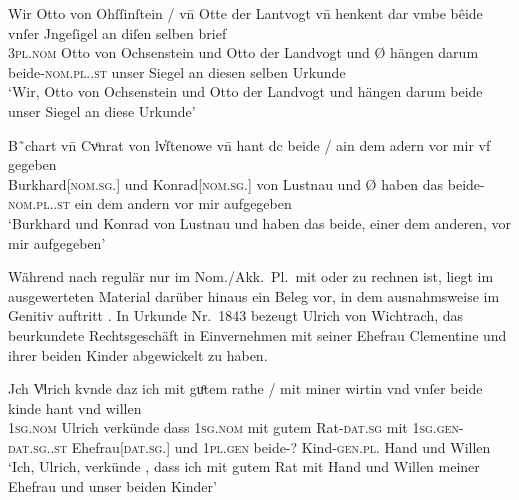 \begin{exe}
\ex \label{ex:vvfinctrl2}
	\begin{xlist}
	\ex \label{ex:vvfinctrl2_1}
		\gll Wir Otto von Ohſſinſtein / vn̄ Otte der Lantvogt \textelp{} vn̄ {}
				henkent {dar vmbe} bêide vnſer Jngeſigel an diſen selben
				brief \\
			\textsc{3pl\subM.nom} Otto von Ochsenstein {} und Otto der Landvogt
				{} und Ø\subM{} hängen darum beide-\textsc{nom.pl.\MascM.st}
				unser Siegel an diesen selben Urkunde \\
		\trans `Wir, Otto von Ochsenstein und Otto der Landvogt \textelp{}
			und  hängen darum beide unser Siegel an diese Urkunde'
			\parencites(Nr.~1145, Burg Ochsenstein, Dépt.~Bas-Rhin, 1289)[427,5--6]{cao2}

	\ex \label{ex:vvfinctrl2_2}
		\gll B˜chart vn̄ Cvͦnrat von lv̓ſtenowe \textelp{} vn̄ {} hant dc beide
				/ ain dem adern vor mir {vf gegeben} \\
			Burkhard[\textsc{nom.sg.\MascM}] und Konrad[\textsc{nom.sg.\MascM}]
				von Lustnau {} und Ø\subM{} haben das
				beide-\textsc{nom.pl.\MascM.st} {} ein dem andern vor mir
				aufgegeben \\
		\trans `Burkhard und Konrad von Lustnau \textelp{} und
			 haben das beide, einer dem anderen, vor mir
			aufgegeben'
			\parencites(Nr.~2607, Tübingen, 1297)[32,41--33,1]{cao4}
	\end{xlist}
\end{exe}

\label{phsec:beidegen}
Während nach \citet[623]{ksw2} regulär nur im Nom./Akk.~Pl.\ mit 
oder  zu rechnen ist, liegt im ausgewerteten Material darüber
hinaus ein Beleg vor, in dem  ausnahmsweise im Genitiv auftritt
. In Urkunde Nr.~1843 \autocite[146,11--47]{cao3} bezeugt
Ulrich von Wichtrach, das beurkundete Rechtsgeschäft in Einvernehmen mit seiner
Ehefrau Clementine und ihrer beiden Kinder abgewickelt zu haben.

\begin{exe}
\ex\label{ex:1843_kinde}
	\gll Jch Vͦlrich \textelp{} kvnde \textelp{} daz ich mit guͦtem rathe
			/ mit miner wirtin \textelp{} vnd vnſer beide kinde hant
			vnd willen \\
		\textsc{1sg\subM.nom} Ulrich {} verkünde {} dass \textsc{1sg\subM.nom} mit gutem
			Rat-\textsc{dat.sg} {} mit \textsc{1sg\subM.gen-dat.sg.\FemF.st}
			Ehefrau[\textsc{dat.sg.\FemF}] {} und \textsc{1pl\subMF.gen} beide-?
			Kind-\textsc{gen.pl.\NeutA} Hand und Willen \\
	\trans `Ich, Ulrich, \textelp{} verkünde \textelp{}, dass ich mit
		gutem Rat  mit Hand und Willen meiner Ehefrau \textelp{}
		und unser beiden Kinder'
		\parencites(Nr.~1843, Thun, Kt.~Bern, 1293)[146,11--13]{cao3}
\end{exe}

